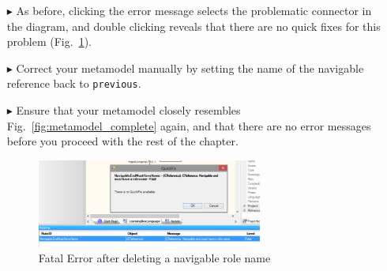 \begin{enumerate}
You should now see a new \texttt{Fatal Error} in the validation output, stating that a navigable end \emph{must} have a role name (Fig.~\ref{fig:fatal-error}).
As navigable references are mapped to data members in a Java class, omitting the name of a navigable reference makes code generation impossible (data members, i.e., class variables must have a name).

\item[$\blacktriangleright$] As before, clicking the error message selects the problematic connector in the diagram, and double clicking reveals that there are no quick fixes for this problem (Fig.~\ref{fig:fatal-error}).
\item[$\blacktriangleright$] Correct your metamodel manually by setting the name of the navigable reference back to \texttt{previous}.
\item[$\blacktriangleright$] Ensure that your metamodel closely resembles Fig.~\ref{fig:metamodel_complete} again, and that there are no error messages before you proceed with the rest of the chapter.

\begin{figure}[htbp]
	\centering
  \includegraphics[width=0.7\textwidth]{pics/memBoxBilder/memBox47}
	\caption{Fatal Error after deleting a navigable role name}
	\label{fig:fatal-error}
\end{figure}
\end{enumerate}

